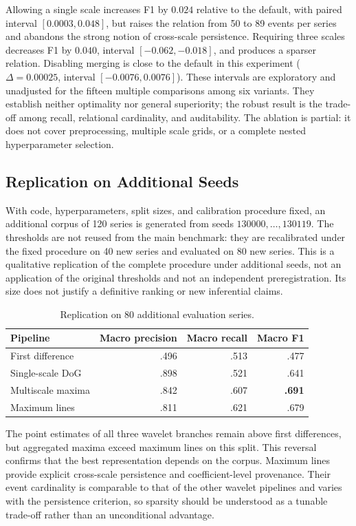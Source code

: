 \documentclass[11pt,a4paper]{article}
\begin{document}
Allowing a single scale increases F1 by $0.024$ relative to the default, with paired interval $[0.0003,0.048]$, but raises the relation from 50 to 89 events per series and abandons the strong notion of cross-scale persistence. Requiring three scales decreases F1 by $0.040$, interval $[-0.062,-0.018]$, and produces a sparser relation. Disabling merging is close to the default in this experiment ($\Delta=0.00025$, interval $[-0.0076,0.0076]$). These intervals are exploratory and unadjusted for the fifteen multiple comparisons among six variants. They establish neither optimality nor general superiority; the robust result is the trade-off among recall, relational cardinality, and auditability. The ablation is partial: it does not cover preprocessing, multiple scale grids, or a complete nested hyperparameter selection.

\subsection{Replication on Additional Seeds}

With code, hyperparameters, split sizes, and calibration procedure fixed, an additional corpus of 120 series is generated from seeds $130000,\ldots,130119$. The thresholds are not reused from the main benchmark: they are recalibrated under the fixed procedure on 40 new series and evaluated on 80 new series. This is a qualitative replication of the complete procedure under additional seeds, not an application of the original thresholds and not an independent preregistration. Its size does not justify a definitive ranking or new inferential claims.

\begin{table}[H]
\centering
\caption{Replication on 80 additional evaluation series.}
\label{tab:additional_seed}
\small
\begin{tabular}{lrrr}
\toprule
Pipeline & Macro precision & Macro recall & Macro F1 \\
\midrule
First difference & .496 & .513 & .477 \\
Single-scale DoG & .898 & .521 & .641 \\
Multiscale maxima & .842 & .607 & \textbf{.691} \\
Maximum lines & .811 & .621 & .679 \\
\bottomrule
\end{tabular}
\end{table}

The point estimates of all three wavelet branches remain above first differences, but aggregated maxima exceed maximum lines on this split. This reversal confirms that the best representation depends on the corpus. Maximum lines provide explicit cross-scale persistence and coefficient-level provenance. Their event cardinality is comparable to that of the other wavelet pipelines and varies with the persistence criterion, so sparsity should be understood as a tunable trade-off rather than an unconditional advantage.
\end{document}
